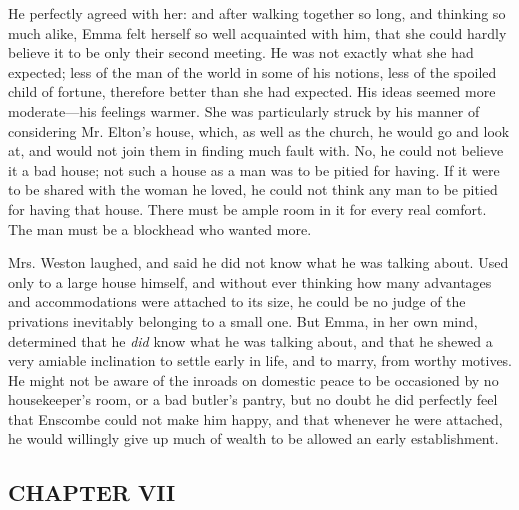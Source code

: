 
He perfectly agreed with her: and after walking together so long, and thinking so much alike, Emma felt herself so well acquainted with him, that she could hardly believe it to be only their second meeting. He was not exactly what she had expected; less of the man of the world in some of his notions, less of the spoiled child of fortune, therefore better than she had expected. His ideas seemed more moderate---his feelings warmer. She was particularly struck by his manner of considering Mr. Elton's house, which, as well as the church, he would go and look at, and would not join them in finding much fault with. No, he could not believe it a bad house; not such a house as a man was to be pitied for having. If it were to be shared with the woman he loved, he could not think any man to be pitied for having that house. There must be ample room in it for every real comfort. The man must be a blockhead who wanted more.

Mrs. Weston laughed, and said he did not know what he was talking about. Used only to a large house himself, and without ever thinking how many advantages and accommodations were attached to its size, he could be no judge of the privations inevitably belonging to a small one. But Emma, in her own mind, determined that he {\em did} know what he was talking about, and that he shewed a very amiable inclination to settle early in life, and to marry, from worthy motives. He might not be aware of the inroads on domestic peace to be occasioned by no housekeeper's room, or a bad butler's pantry, but no doubt he did perfectly feel that Enscombe could not make him happy, and that whenever he were attached, he would willingly give up much of wealth to be allowed an early establishment.

\subsection[chapter-vii-1]{\useURL[url26][][][]\from[url26]CHAPTER VII}

